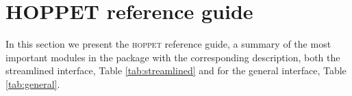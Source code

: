 \documentclass[12pt]{article}
\newcommand{\hoppet}{\textsc{hoppet}\xspace}
\newcommand{\ttt}[1]{\texttt{#1}}
\begin{document}



\section{HOPPET reference guide}
\label{sec:refguide}

In this section we present the \hoppet reference guide, a 
summary of the most important modules in the package with
the corresponding description, both the streamlined interface,
Table \ref{tab:streamlined} and for the general interface,
Table  \ref{tab:general}.
\end{document}
